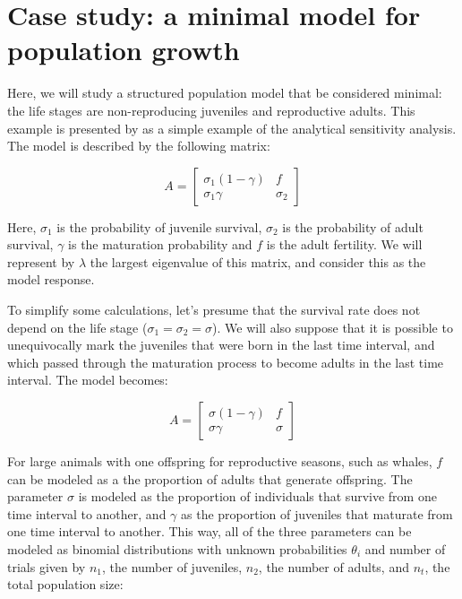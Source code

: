\documentclass[twoside,12pt,a4paper]{article}
\begin{document}
\section[Case study]{Case study: a minimal model for population growth}

Here, we will study a structured population model that be considered minimal:
the life stages are non-reproducing juveniles and reproductive adults. This example 
is presented by \citep{Caswell08} as a simple example of the analytical sensitivity analysis. The model
is described by the following matrix:

\begin{equation}
 A = \left[
 \begin{array}{ll}
	 \sigma_1 (1-\gamma) &   f \\
     \sigma_1 \gamma & \sigma_2
 \end{array}
 \right]
\end{equation}

Here, $\sigma_1$ is the probability of juvenile survival, $\sigma_2$ is the probability of adult survival,
$\gamma$ is the maturation probability and $f$ is the adult fertility. We will represent by $\lambda$ the
largest eigenvalue of this matrix, and consider this as the model response.

To simplify some calculations, let's presume that the survival rate does not depend on the life stage
($\sigma_1=\sigma_2=\sigma$). We will also suppose that it is possible to unequivocally mark the juveniles
that were born in the last time interval, and which passed through the maturation process to become adults
in the last time interval. The model becomes:

\begin{equation}
 A = \left[
 \begin{array}{ll}
	 \sigma (1-\gamma) &   f \\
     \sigma \gamma & \sigma
 \end{array}
 \right]
\end{equation}

For large animals with one offspring for reproductive seasons, such as whales, $f$ can be modeled as a the
proportion of adults that generate offspring. The parameter $\sigma$ is modeled as the proportion of 
individuals that survive from one time interval to another, and $\gamma$ as the proportion of juveniles that
maturate from one time interval to another. This way, all of the three parameters can be modeled as
binomial distributions with unknown probabilities 
$\theta_i$ and number of trials given by 
$n_1$, the number of juveniles, $n_2$, the number of adults, and $n_t$, the total population size:
\end{document}
